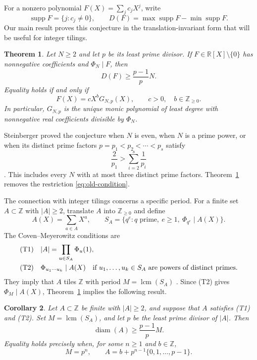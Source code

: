 \documentclass[11pt]{article}
\newtheorem{theorem}{Theorem}[section]
\newtheorem{corollary}[theorem]{Corollary}
\theoremstyle{definition}
\theoremstyle{remark}
\numberwithin{equation}{section}
\DeclareMathOperator{\supp}{supp}
\DeclareMathOperator{\diam}{diam}
\DeclareMathOperator{\lcm}{lcm}
\newcommand{\Z}{\mathbb Z}
\newcommand{\R}{\mathbb R}
\newcommand{\NN}{\mathbb Z_{\ge0}}
\begin{document}
For a nonzero polynomial $F(X)=\sum_jc_jX^j$, write
\[
 \supp F=\{j:c_j\ne0\},\qquad
 D(F)=\max\supp F-\min\supp F.
\]
Our main result proves this conjecture in the translation-invariant
form that will be useful for integer tilings.

\begin{theorem}\label{thm:main}
Let $N\ge2$ and let $p$ be its least prime divisor. If
$F\in\R[X]\setminus\{0\}$ has nonnegative coefficients and $\Phi_N\mid F$,
then
\begin{equation}\label{eq:main}
 D(F)\ge\frac{p-1}{p}N.
\end{equation}
Equality holds if and only if
\begin{equation}\label{eq:main-equality}
 F(X)=cX^bG_{N,p}(X),\qquad c>0,\quad b\in\NN.
\end{equation}
In particular, $G_{N,p}$ is the unique monic polynomial of least degree
with nonnegative real coefficients divisible by $\Phi_N$.
\end{theorem}

Steinberger proved the conjecture when $N$ is even, when $N$ is a prime
power, or when its distinct prime factors $p=p_1<p_2<\cdots<p_s$ satisfy
\begin{equation}\label{eq:old-condition}
 \frac2{p_1}>\sum_{i=2}^s\frac1{p_i}
\end{equation}
\cite[Theorem~1]{Steinberger}. This includes every $N$ with at most
three distinct prime factors. Theorem~\ref{thm:main} removes the
restriction \eqref{eq:old-condition}.

The connection with integer tilings concerns a specific period. For a
finite set $A\subset\Z$ with $|A|\ge2$, translate $A$ into $\NN$ and define
\begin{equation}\label{eq:SA}
 A(X)=\sum_{a\in A}X^a,\qquad
 S_A=\{q^e:q\text{ prime},\ e\ge1,\ \Phi_{q^e}\mid A(X)\}.
\end{equation}
The Coven--Meyerowitz conditions are
\begin{align*}
 \textnormal{(T1)}\quad & |A|=\prod_{u\in S_A}\Phi_u(1),\\
 \textnormal{(T2)}\quad & \Phi_{u_1\cdots u_k}\mid A(X)
 \quad\text{if }u_1,\ldots,u_k\in S_A
 \text{ are powers of distinct primes}.
\end{align*}
They imply that $A$ tiles $\Z$ with period $M=\lcm(S_A)$
\cite[Theorem~A]{CM}. Since (T2) gives $\Phi_M\mid A(X)$,
Theorem~\ref{thm:main} implies the following result.

\begin{corollary}\label{cor:CM}
Let $A\subset\Z$ be finite with $|A|\ge2$, and suppose that $A$ satisfies
(T1) and (T2). Set $M=\lcm(S_A)$, and let $p$ be the least prime divisor
of $|A|$. Then
\begin{equation}\label{eq:CM}
 \diam(A)\ge\frac{p-1}{p}M.
\end{equation}
Equality holds precisely when, for some $n\ge1$ and $b\in\Z$,
\begin{equation}\label{eq:CM-equality}
 M=p^n,\qquad A=b+p^{n-1}\{0,1,\ldots,p-1\}.
\end{equation}
\end{corollary}
\end{document}
